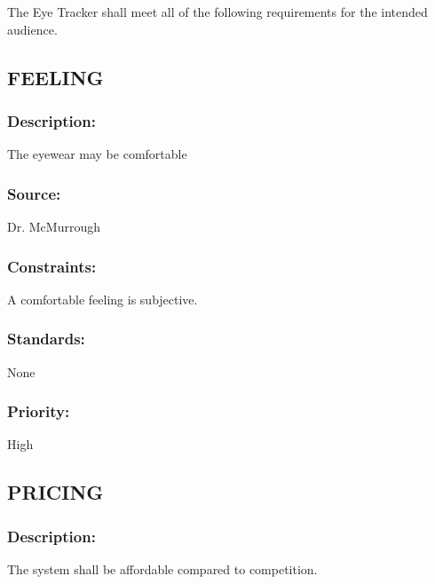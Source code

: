 The Eye Tracker shall meet all of the following requirements for the intended audience. 

\subsection{\text FEELING}
\subsubsection{Description:}
	{The eyewear may be comfortable}
\subsubsection{Source: }
	{Dr. McMurrough}
\subsubsection{Constraints:}
	{A comfortable feeling is subjective.}
\subsubsection{Standards:}
	{None}
\subsubsection{Priority:}
	{High}
\newline
\newline
	
\subsection{\text PRICING}
\subsubsection{Description:} 
	{The system shall be affordable compared to competition.}
